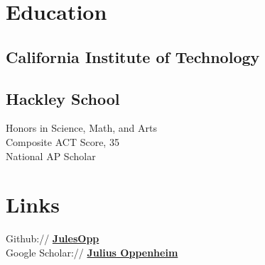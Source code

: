 \documentclass[letterpaper]{deedy-resume} %
\begin{document}
\begin{minipage}[t]{0.39\textwidth} %


\section{Education} 

\subsection{California Institute of \newline Technology}


\sectionspace %

\subsection{Hackley School}

Honors in Science, Math, and Arts \\
Composite ACT Score, 35 \\
National AP Scholar \\


\sectionspace %



\section{Links} 

Github:// \href{https://github.com/JulesOpp}{\bf JulesOpp} \\
Google Scholar:// \href{https://scholar.google.com/citations?user=2yNJuKkAAAAJ&hl=en}{\bf Julius Oppenheim}

\sectionspace %



\end{minipage}
\end{document}
